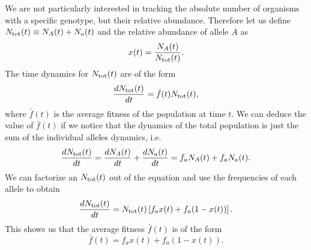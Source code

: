 We are not particularly interested in tracking the absolute number of organisms
with a specific genotype, but their relative abundance. Therefore let us define
$N_{\text{tot}}(t) \equiv N_A(t) + N_a(t)$ and the relative abundance of allele $A$ as
\begin{equation}
  x(t) = {N_A(t) \over N_{\text{tot}}(t)}.
\end{equation}
The time dynamics for $N_{\text{tot}}(t)$ are of the form
\begin{equation}
  {d{N_{\text{tot}}(t)} \over dt} = \bar{f}(t) N_{\text{tot}}(t),
\end{equation}
where $\bar{f}(t)$ is the average fitness of the population at time $t$. We can
deduce the value of $\bar{f}(t)$ if we notice that the dynamics of the total
population is just the sum of the individual alleles dynamics, i.e.
\begin{equation}
  {d{N_{\text{tot}}(t)} \over dt} = {d{N_A(t)} \over dt} + {d{N_a(t)} \over dt} = f_a N_A(t) + f_a N_a(t).
\end{equation}
We can factorize an $N_{\text{tot}}(t)$ out of the equation and use the frequencies of
each allele to obtain
\begin{equation}
  {d{N_{\text{tot}}(t)} \over dt} = N_{\text{tot}}(t) \left[ f_a x(t) + f_a (1 - x(t)) \right].
\end{equation}
This shows us that the average fitness $\bar{f}(t)$ is of the form
\begin{equation}
  \bar{f}(t) = f_a x(t) + f_a (1 - x(t)).
\end{equation}

